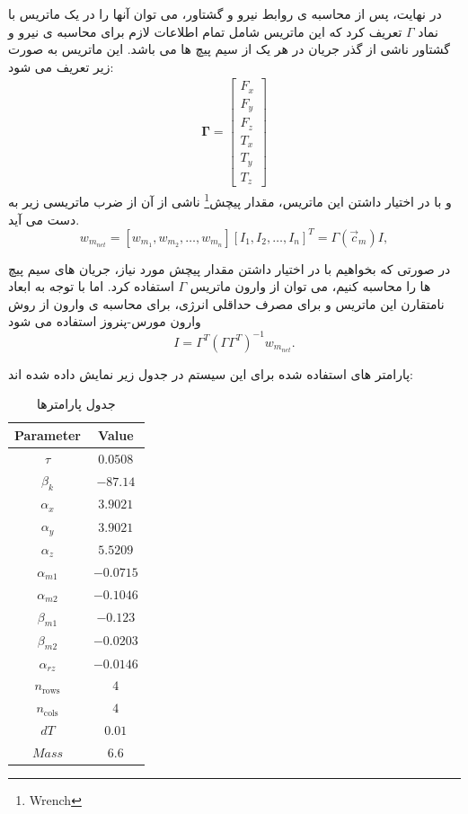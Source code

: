 \begin{enumerate}
	در نهایت، پس از محاسبه ی روابط نیرو و گشتاور، می توان آنها را در یک ماتریس با نماد $\Gamma$ تعریف کرد که این ماتریس شامل تمام اطلاعات لازم برای محاسبه ی نیرو و گشتاور ناشی از گذر جریان در هر یک از سیم پیچ ها می باشد. این ماتریس به صورت زیر تعریف می شود:
	\begin{align}
		\mathbf{\Gamma} =
		\begin{bmatrix}
			F_x \\ F_y \\ F_z \\ T_x \\ T_y \\ T_z
		\end{bmatrix}
	\end{align}
	و با در اختیار داشتن این ماتریس، مقدار پیچش\footnote{Wrench} ناشی از آن از ضرب ماتریسی زیر به دست می آید.
	\begin{equation}
		w_m_{net} = [w_m_1, w_m_2, \dots, w_m_n] [I_1, I_2, \dots, I_n]^T = \Gamma(\vec{c}_m) I,
	\end{equation}
	
	در صورتی که بخواهیم با در اختیار داشتن مقدار پیچش مورد نیاز، جریان های سیم پیچ ها را محاسبه کنیم، می توان از وارون ماتریس $\Gamma$ استفاده کرد. اما با توجه به ابعاد نامتقارن این ماتریس و برای مصرف حداقلی انرژی، برای محاسبه ی وارون از روش وارون مورس-پنروز استفاده می شود
\begin{equation}
	I = \Gamma^T (\Gamma \Gamma^T)^{-1} w_m_{net}.
\end{equation}
	
	پارامتر های استفاده شده برای این سیستم در جدول زیر نمایش داده شده اند:
	\begin{table}[h]
		\centering
		\begin{tabular}{|c|c|}
			\hline
			\textbf{Parameter} & \textbf{Value} \\
			\hline
			$\tau$ & $0.0508$ \\
			$\beta_k$ & $-87.14$ \\
			$\alpha_x$ & $3.9021$ \\
			$\alpha_y$ & $3.9021$ \\
			$\alpha_z$ & $5.5209$ \\
			$\alpha_{m1}$ & $-0.0715$ \\
			$\alpha_{m2}$ & $-0.1046$ \\
			$\beta_{m1}$ & $-0.123$ \\
			$\beta_{m2}$ & $-0.0203$ \\
			$\alpha_{rz}$ & $-0.0146$ \\
			$n_{\text{rows}}$ & $4$ \\
			$n_{\text{cols}}$ & $4$ \\
			$dT$ & $0.01$ \\
			$Mass$ & $6.6$ \\
			\hline
		\end{tabular}
		\caption{جدول پارامترها}
		\label{tab:parameters}
	\end{table}
	
\end{enumerate}
